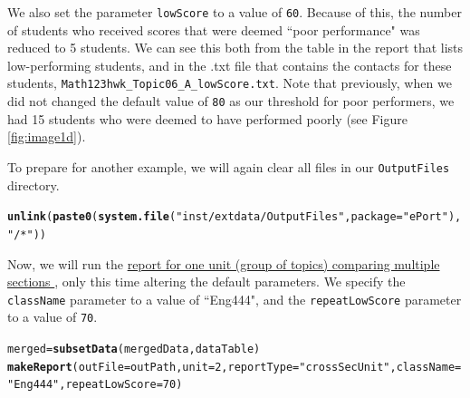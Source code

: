 \documentclass[11pt,a4paper,oldfontcommands,openany]{memoir}
\makeatletter
\newcommand{\hlnum}[1]{\textcolor[rgb]{0.686,0.059,0.569}{#1}}%
\newcommand{\hlstr}[1]{\textcolor[rgb]{0.192,0.494,0.8}{#1}}%
\newcommand{\hlstd}[1]{\textcolor[rgb]{0.345,0.345,0.345}{#1}}%
\newcommand{\hlkwb}[1]{\textcolor[rgb]{0.69,0.353,0.396}{#1}}%
\newcommand{\hlkwc}[1]{\textcolor[rgb]{0.333,0.667,0.333}{#1}}%
\newcommand{\hlkwd}[1]{\textcolor[rgb]{0.737,0.353,0.396}{\textbf{#1}}}%
\newenvironment{kframe}{%
 \def\at@end@of@kframe{}%
 \ifinner\ifhmode%
  \def\at@end@of@kframe{\end{minipage}}%
  \begin{minipage}{\columnwidth}%
 \fi\fi%
 \def\FrameCommand##1{\hskip\@totalleftmargin \hskip-\fboxsep
 \colorbox{shadecolor}{##1}\hskip-\fboxsep
     \hskip-\linewidth \hskip-\@totalleftmargin \hskip\columnwidth}%
 \MakeFramed {\advance\hsize-\width
   \@totalleftmargin\z@ \linewidth\hsize
   \@setminipage}}%
 {\par\unskip\endMakeFramed%
 \at@end@of@kframe}
\newenvironment{knitrout}{}{} %
\numberwithin{equation}{section} %
\makeatother
\begin{document}
We also set the parameter \texttt{lowScore} to a value of \texttt{60}. Because of this, the number of students who received scores that were deemed ``poor performance" was reduced to 5 students. We can see this both from the table in the report that lists low-performing students, and in the .txt file that contains the contacts for these students, \texttt{Math123hwk\_Topic06\_A\_lowScore.txt}. Note that previously, when we did not changed the default value of \texttt{80} as our threshold for poor performers, we had 15 students who were deemed to have performed poorly (see Figure \ref{fig:image1d}).

To prepare for another example, we will again clear all files in our \texttt{OutputFiles} directory. \\

\begin{knitrout}
\color{fgcolor}\begin{kframe}
\begin{alltt}
\hlkwd{unlink}\hlstd{(}\hlkwd{paste0}\hlstd{(}\hlkwd{system.file}\hlstd{(}\hlstr{"inst/extdata/OutputFiles"}\hlstd{,} \hlkwc{package} \hlstd{=} \hlstr{"ePort"}\hlstd{),} \hlstr{"/*"}\hlstd{))}
\end{alltt}
\end{kframe}
\end{knitrout}

Now, we will run the \hyperref[sec:crossSecU]{report for one unit (group of topics) comparing multiple sections }, only this time altering the default parameters. We specify the \texttt{className} parameter to a value of ``Eng444", and the \texttt{repeatLowScore} parameter to a value of \texttt{70}. \\

\begin{knitrout}
\color{fgcolor}\begin{kframe}
\begin{alltt}
\hlstd{merged} \hlkwb{=} \hlkwd{subsetData}\hlstd{(mergedData, dataTable)}
\hlkwd{makeReport}\hlstd{(}\hlkwc{outFile} \hlstd{= outPath,} \hlkwc{unit} \hlstd{=} \hlnum{2}\hlstd{,} \hlkwc{reportType} \hlstd{=} \hlstr{"crossSecUnit"}\hlstd{,} \hlkwc{className} \hlstd{=}
  \hlstr{"Eng444"}\hlstd{,} \hlkwc{repeatLowScore} \hlstd{=} \hlnum{70}\hlstd{)}
\end{alltt}
\end{kframe}
\end{knitrout}
\end{document}
